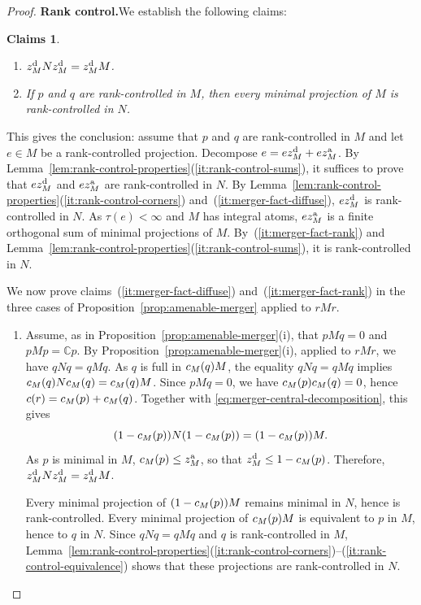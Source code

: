 \documentclass[11pt]{amsart}
\makeatletter
\numberwithin{equation}{section}
\newcommand{\cc}{\mathbb C}
\newcommand{\@optsub}[1]{\if\relax\detokenize{#1}\relax\else_{#1}\fi}
\newcommand{\csupp}[2][]{c\@optsub{#1}(#2)}
\newcommand{\zat}[1][]{z^{\mathrm{a}}\@optsub{#1}}
\newcommand{\zdiff}[1][]{z^{\mathrm{d}}\@optsub{#1}}
\newtheorem{claims}[The]{Claims}
\theoremstyle{definition}
\makeatother
\begin{document}
\begin{proof}
    \smallskip
    \noindent\textbf{Rank control.}\enspace We establish the following claims:
    \begin{claims}
        \label{fact:merger-key-facts}
        \leavevmode
        \begin{enumerate}[\rm (a)]
            \item\label{it:merger-fact-diffuse} $\zdiff[M]N\zdiff[M]=\zdiff[M]M$.
            \item\label{it:merger-fact-rank} If $p$ and $q$ are rank-controlled in $M$, then every minimal projection of $M$ is rank-controlled in $N$.
        \end{enumerate}
    \end{claims}
    This gives the conclusion: assume that $p$ and $q$ are rank-controlled in $M$ and let $e\in M$ be a rank-controlled projection. Decompose $e=e\zdiff[M]+e\zat[M]$. By Lemma~\ref{lem:rank-control-properties}\textup{(\ref*{it:rank-control-sums})}, it suffices to prove that $e\zdiff[M]$ and $e\zat[M]$ are rank-controlled in $N$. By Lemma~\ref{lem:rank-control-properties}\textup{(\ref*{it:rank-control-corners})} and~\textup{(\ref*{it:merger-fact-diffuse})}, $e\zdiff[M]$ is rank-controlled in $N$. As $\tau(e)<\infty$ and $M$ has integral atoms, $e\zat[M]$ is a finite orthogonal sum of minimal projections of $M$. By~\textup{(\ref*{it:merger-fact-rank})} and Lemma~\ref{lem:rank-control-properties}\textup{(\ref*{it:rank-control-sums})}, it is rank-controlled in $N$.

    We now prove claims~\textup{(\ref*{it:merger-fact-diffuse})} and~\textup{(\ref*{it:merger-fact-rank})} in the three cases of Proposition~\ref{prop:amenable-merger} applied to $rMr$.

    \begin{enumerate}[\rm (i)]
    \item Assume, as in Proposition~\ref{prop:amenable-merger}\textup{(i)}, that $pMq=0$ and $pMp=\cc p$. By Proposition~\ref{prop:amenable-merger}\textup{(i)}, applied to $rMr$, we have $qNq=qMq$. As $q$ is full in $\csupp[M]{q}M$, the equality $qNq=qMq$ implies $\csupp[M]{q}N\csupp[M]{q}=\csupp[M]{q}M$.  Since $pMq=0$, we have $\csupp[M]{p}\csupp[M]{q}=0$, hence $\csupp{r}=\csupp[M]{p}+\csupp[M]{q}$. Together with \eqref{eq:merger-central-decomposition}, this gives $$(1-\csupp[M]{p})N(1-\csupp[M]{p})=(1-\csupp[M]{p})M.$$ As $p$ is minimal in $M$, $\csupp[M]{p}\leq\zat[M]$, so that $\zdiff[M]\leq1-\csupp[M]{p}$. Therefore, $\zdiff[M]N\zdiff[M]=\zdiff[M]M$. 
    
    Every minimal projection of $(1-\csupp[M]{p})M$ remains minimal in $N$, hence is rank-controlled. Every minimal projection of $\csupp[M]{p}M$ is equivalent to $p$ in $M$, hence to $q$ in $N$. Since $qNq=qMq$ and $q$ is rank-controlled in $M$, Lemma~\ref{lem:rank-control-properties}\textup{(\ref*{it:rank-control-corners})--(\ref*{it:rank-control-equivalence})} shows that these projections are rank-controlled in $N$.


\end{enumerate}
\end{proof}
\end{document}
